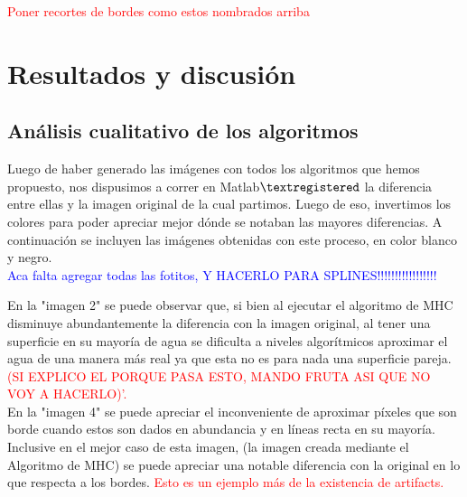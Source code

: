\documentclass[a4paper]{article}
\begin{document}
\textcolor{red}{Poner recortes de bordes como estos nombrados arriba}




\newpage
\section{Resultados y discusi\'on}


\subsection{An\'alisis cualitativo de los algoritmos}
Luego de haber generado las im\'agenes con todos los algoritmos que hemos propuesto, nos dispusimos a correr en Matlab$\textregistered$  la diferencia entre ellas y la imagen original de la cual partimos. Luego de eso, invertimos los colores para poder apreciar mejor d\'onde se notaban las mayores diferencias. A continuaci\'on se incluyen las im\'agenes obtenidas con este proceso, en color blanco y negro.\\

\textcolor{blue}{Aca falta agregar todas las fotitos, Y HACERLO PARA SPLINES!!!!!!!!!!!!!!!!!}


En la "imagen 2"  se puede observar que, si bien al ejecutar el algoritmo de MHC disminuye abundantemente la diferencia con la imagen original, al tener una superficie en su mayor\'ia de agua se dificulta a niveles algor\'itmicos aproximar el agua de una manera m\'as real ya que esta no es para nada una superficie pareja. \textcolor{red}{(SI EXPLICO EL PORQUE PASA ESTO, MANDO FRUTA ASI QUE NO VOY A HACERLO)'.}\\

En la "imagen 4" se puede apreciar el inconveniente de aproximar p\'ixeles que son borde cuando estos son dados en abundancia y en l\'ineas recta en su mayor\'ia. Inclusive en el mejor caso de esta imagen, (la imagen creada mediante el Algoritmo de MHC) se puede apreciar una notable diferencia con la original en lo que respecta a los bordes. \textcolor{red}{Esto es un ejemplo m\'as de la existencia de artifacts.}\\
\end{document}
